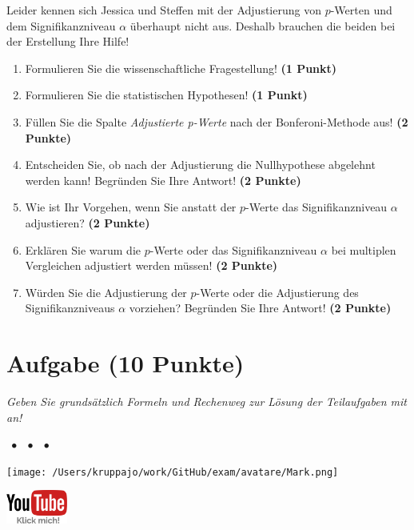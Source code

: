 \documentclass[a4paper, 9pt]{scrartcl}\usepackage[]{graphicx}\usepackage[]{xcolor}
\begin{document}
Leider kennen sich Jessica und Steffen mit der Adjustierung von $p$-Werten und dem Signifikanzniveau $\alpha$ überhaupt nicht aus. Deshalb brauchen die beiden bei der Erstellung Ihre Hilfe!

\begin{enumerate}
  \item Formulieren Sie die wissenschaftliche Fragestellung! \textbf{(1 Punkt)}
  \item Formulieren Sie die statistischen Hypothesen! \textbf{(1 Punkt)}
\item Füllen Sie die Spalte \textit{Adjustierte p-Werte} nach der Bonferoni-Methode aus! \textbf{(2 Punkte)}
\item Entscheiden Sie, ob nach der Adjustierung die Nullhypothese abgelehnt werden kann! Begründen Sie Ihre Antwort! \textbf{(2 Punkte)}
\item Wie ist Ihr Vorgehen, wenn Sie anstatt der $p$-Werte das Signifikanzniveau $\alpha$ adjustieren? \textbf{(2 Punkte)}
\item Erklären Sie warum die $p$-Werte oder das Signifikanzniveau $\alpha$ bei multiplen Vergleichen adjustiert werden müssen! \textbf{(2 Punkte)}
\item Würden Sie die Adjustierung der $p$-Werte oder die Adjustierung des Signifikanzniveaus $\alpha$ vorziehen? Begründen Sie Ihre Antwort! \textbf{(2 Punkte)}
\end{enumerate}


 
\clearpage

\section{Aufgabe \hfill (10 Punkte)}

\textit{Geben Sie grundsätzlich Formeln und Rechenweg zur Lösung der Teilaufgaben mit an!} \\[1Ex]
 

 
\ifcollection
\begin{flushright}
\tiny\vspace{-3Ex}
\textbf{\examinhaltstart}
\exammodulestat $\;\bullet$
\exammodulestatbbv $\;\bullet$
\exammodulestatversuch $\;\bullet$
\exammodulebiostat
\vspace{-4Ex}
\end{flushright}
\begin{minipage}[t]{0.5\textwidth}
\texttt{[image: /Users/kruppajo/work/GitHub/exam/avatare/Mark.png]}
\end{minipage}
\begin{minipage}[t]{0.5\textwidth}
\hfill
\href{https://youtu.be/xq29O8qDrg0}{\includegraphics[width = 2cm]{img/youtube}}
\end{minipage}
\vspace{-3ex}
\fi
\end{document}
